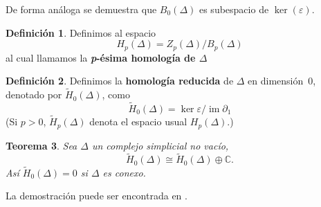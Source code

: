 \documentclass[12pt]{book}
\newtheorem{theorem}{Teorema}[section]
\theoremstyle{definition}
\newtheorem{definition}[theorem]{Definición}
\DeclareMathOperator{\im}{im}
\newcounter{in}
\newcounter{ini}
\begin{document}
De forma análoga se demuestra que $B_{0}(\Delta)$ es subespacio de $\ker(\varepsilon)$.
\begin{definition}
   Definimos al espacio
   $$H_{p}(\Delta)=Z_{p}(\Delta)/B_{p}(\Delta)$$
   al cual llamamos la \textbf{\emph{p}-ésima homología de $\Delta$}
\end{definition}

\begin{definition}
  Definimos la \textbf{homología reducida} de $\Delta$ en
  dimensión~$0$, denotado por $\widetilde H_{0}(\Delta)$, como
  \begin{equation*}
    \widetilde H_{0}(\Delta)=\ker\varepsilon/\im \partial_{1}
  \end{equation*}
  (Si $p>0$, $\widetilde H_{p}(\Delta)$ denota el espacio usual
  $H_{p}(\Delta)$.)
\end{definition}

\begin{theorem}
  Sea $\Delta$ un complejo simplicial no vacío,
  $$\widetilde H_{0}(\Delta)\cong \widetilde H_{0}(\Delta)\oplus
  \mathbb{C}.$$
  Así $\widetilde H_{0}(\Delta)=0$ si $\Delta$ es conexo.
\end{theorem}
La demostración puede ser encontrada en \cite{munkres1984elements}.
\end{document}
